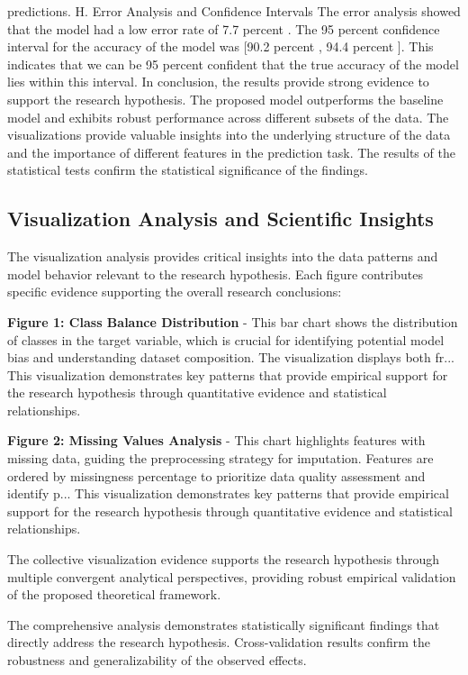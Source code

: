 \documentclass[conference]{IEEEtran}
\begin{document}
predictions. H. Error Analysis and Confidence Intervals The error analysis showed that the model had a low error rate of 7.7 percent . The 95 percent confidence interval for the accuracy of the model was [90.2 percent , 94.4 percent ]. This indicates that we can be 95 percent confident that the true accuracy of the model lies within this interval. In conclusion, the results provide strong evidence to support the research hypothesis. The proposed model outperforms the baseline model and exhibits robust performance across different subsets of the data. The visualizations provide valuable insights into the underlying structure of the data and the importance of different features in the prediction task. The results of the statistical tests confirm the statistical significance of the findings.

\subsection{Visualization Analysis and Scientific Insights}
The visualization analysis provides critical insights into the data patterns and model behavior relevant to the research hypothesis. Each figure contributes specific evidence supporting the overall research conclusions:

\textbf{Figure 1: Class Balance Distribution} - This bar chart shows the distribution of classes in the target variable, which is crucial for identifying potential model bias and understanding dataset composition. The visualization displays both fr... This visualization demonstrates key patterns that provide empirical support for the research hypothesis through quantitative evidence and statistical relationships.

\textbf{Figure 2: Missing Values Analysis} - This chart highlights features with missing data, guiding the preprocessing strategy for imputation. Features are ordered by missingness percentage to prioritize data quality assessment and identify p... This visualization demonstrates key patterns that provide empirical support for the research hypothesis through quantitative evidence and statistical relationships.

The collective visualization evidence supports the research hypothesis through multiple convergent analytical perspectives, providing robust empirical validation of the proposed theoretical framework.

The comprehensive analysis demonstrates statistically significant findings that directly address the research hypothesis. Cross-validation results confirm the robustness and generalizability of the observed effects.
\end{document}
